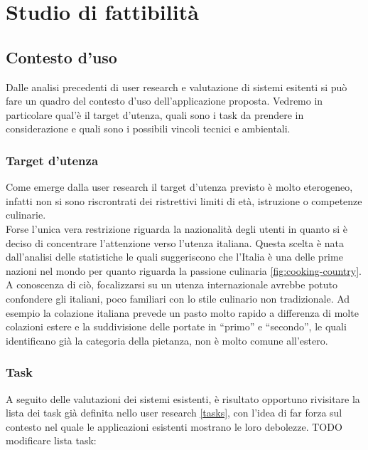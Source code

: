 \section{Studio di fattibilità}

\subsection{Contesto d'uso}
Dalle analisi precedenti di user research e valutazione di sistemi
esitenti si può fare un quadro del contesto d'uso dell'applicazione
proposta.
Vedremo in particolare qual'è il target d'utenza, quali sono i task da
prendere in considerazione e quali sono i possibili vincoli tecnici e
ambientali.

\subsubsection{Target d'utenza}
Come emerge dalla user research il target d'utenza previsto è molto
eterogeneo, infatti non si sono riscrontrati dei ristrettivi limiti di
età, istruzione o competenze culinarie.\\
Forse l'unica vera restrizione riguarda la nazionalità degli utenti
in quanto si è deciso di concentrare
l'attenzione verso l'utenza italiana. Questa scelta è nata dall'analisi
delle statistiche le quali suggeriscono che l'Italia è una delle
prime nazioni nel mondo per quanto riguarda la passione culinaria
\ref{fig:cooking-country}. A conoscenza di ciò, focalizzarsi su un
utenza internazionale avrebbe potuto confondere gli italiani, poco familiari
con lo stile culinario non tradizionale. Ad esempio la colazione
italiana prevede un pasto molto rapido a differenza di molte colazioni
estere e la suddivisione delle portate in ``primo'' e ``secondo'', le quali
identificano già la categoria della pietanza, non è molto comune
all'estero.

\subsubsection{Task}
A seguito delle valutazioni dei sistemi esistenti, è risultato opportuno
rivisitare la lista dei task già definita nello user research
\ref{tasks}, con
l'idea di far forza sul contesto nel quale le applicazioni esistenti
mostrano le loro debolezze.
TODO modificare lista task:

